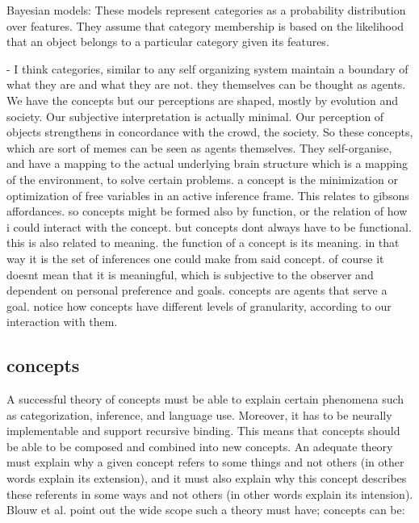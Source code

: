 Bayesian models: These models represent categories as a probability distribution over features. They assume that category membership is based on the likelihood that an object belongs to a particular category given its features.

- I think categories, similar to any self organizing system maintain a boundary of what they are and what they are not. they themselves can be thought as agents. We have the concepts but our perceptions are shaped, mostly by evolution and society. Our subjective interpretation is actually minimal. Our perception of objects strengthens in concordance with the crowd, the society. So these concepts, which are sort of memes can be seen as agents themselves. They self-organise, and have a mapping to the actual underlying brain structure which is a mapping of the environment, to solve certain problems. a concept is the minimization or optimization of free variables in an active inference frame. This relates to gibsons affordances. so concepts might be formed also by function, or the relation of how i could interact with the concept. but concepts dont always have to be functional. this is also related to meaning. the function of a concept is its meaning. in that way it is the set of inferences one could make from said concept. of course it doesnt mean that it is meaningful, which is subjective to the observer and dependent on personal preference and goals. concepts are agents that serve a goal. notice how concepts have different levels of granularity, according to our interaction with them. 











\subsection{concepts}


A successful theory of concepts must be able to explain certain phenomena such as categorization, inference, and language use. Moreover, it has to be neurally implementable and support recursive binding. This means that concepts should be able to be composed and combined into new concepts. An adequate theory must explain why a given concept refers to some things and not others (in other words explain its extension), and it must also explain why this concept describes these referents in some ways and not others (in other words explain its intension). Blouw et al. \cite{blouw2016concepts} point out the wide scope such a theory must have; concepts can be:



